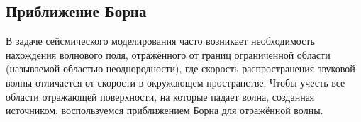 \documentclass[a4paper, fontsize=14pt]{article}
\begin{document}

	

	
	\subsection{Приближение Борна}
	В задаче сейсмического моделирования часто возникает необходимость нахождения волнового поля, отражённого от границ ограниченной области (называемой областью неоднородности), где скорость распространения звуковой волны отличается от скорости в окружающем пространстве. Чтобы учесть все области отражающей поверхности, на которые падает волна, созданная источником, воспользуемся приближением Борна для отражённой волны.\cite{zhdanov2007}
	
\end{document}
